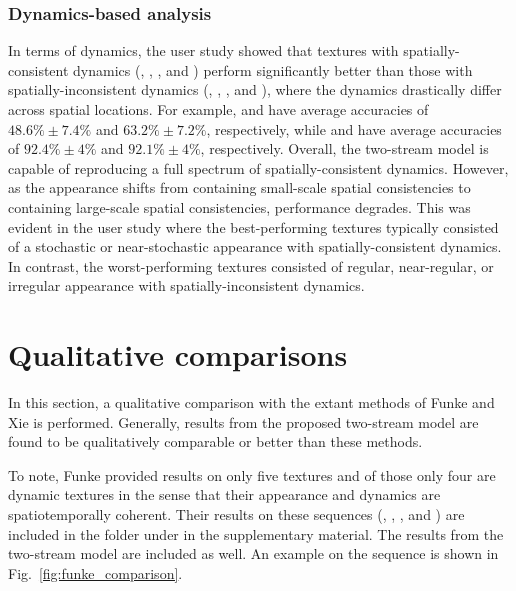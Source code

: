 \subsubsection{Dynamics-based analysis}

In terms of dynamics, the user study showed that textures with
spatially-consistent dynamics (\eg, , 
, and  ) perform 
significantly better than those with spatially-inconsistent 
dynamics (\eg, , , 
and ), where the dynamics drastically differ 
across spatial locations.
For example,  and 
have average accuracies of $48.6\% \pm 7.4\%$ and
$63.2\% \pm 7.2\%$, respectively, while
 and  have average 
accuracies of $92.4\% \pm 4\%$ and $92.1\% \pm 4\%$, 
respectively.
Overall, the two-stream model is capable of reproducing a full spectrum
of spatially-consistent dynamics.
However, as the appearance shifts from containing small-scale 
spatial consistencies to containing large-scale spatial consistencies,
performance degrades.
This  was evident in the user study where the best-performing 
textures typically consisted of a stochastic or
near-stochastic appearance with spatially-consistent 
dynamics.
In contrast, the worst-performing textures consisted of
regular, near-regular, or irregular appearance with
spatially-inconsistent dynamics.

\section{Qualitative comparisons}

In this section, a qualitative comparison with the extant methods of Funke 
\etal \cite{funke2017} and Xie \etal \cite{xie2017synthesizing} is performed.
Generally, results from the proposed two-stream model are found to be qualitatively comparable or better than these methods.

To note, Funke \etal provided results on
only five textures and of those only four
are dynamic textures in the sense that their appearance
and dynamics are spatiotemporally coherent.
Their results on these sequences (, , 
, and ) are included in the folder
 under  in the supplementary material. The results from the two-stream model are included as well. An example on the  sequence is shown in Fig.\ \ref{fig:funke_comparison}.

